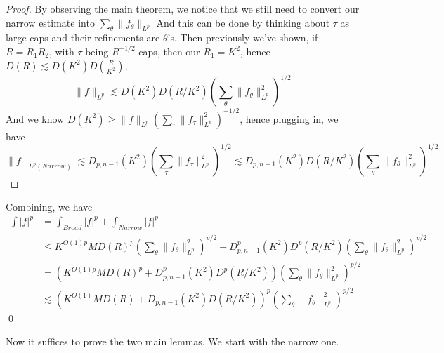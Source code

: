 \begin{proof}
    By observing the main theorem, we notice that we still need to convert our narrow estimate into $\sum_\theta\|f_\theta\|_{L^p}$
    And this can be done by thinking about $\tau$ as large caps and their refinements are $\theta$'s. Then previously we've shown, if $R=R_1R_2$, with $\tau$ being $R^{-1/2}$ caps, then our $R_1=K^2$, hence $D(R)\lesssim D(K^2)D(\frac{R}{K^2})$,
    \begin{equation*}
        \|f\|_{L^p}\lesssim D(K^2)D(R/K^2)\left(\sum_\theta\|f_\theta\|_{L^p}^2 \right)^{1/2}
    \end{equation*}
    And we know $D(K^2)\geq\|f\|_{L^p}\left(\sum_\tau\|f_\tau\|_{L^p}^2 \right)^{-1/2}$, hence plugging in, we have
    \begin{equation*}
        \|f\|_{L^p(Narrow)}\lesssim D_{p,n-1}(K^2)\left(\sum_\tau\|f_\tau\|_{L^p}^2 \right)^{1/2}\lesssim D_{p,n-1}(K^2)D(R/K^2)\left(\sum_\theta\|f_\theta\|_{L^p}^2 \right)^{1/2}
    \end{equation*}
\end{proof}
    Combining, we have
    \begin{align*}
        \int|f|^p&=\int_{Broad}|f|^p+\int_{Narrow}|f|^p\\
        &\leq K^{O(1)p}MD(R)^p\left(\sum_\theta\|f_\theta\|_{L^p}^2 \right)^{p/2}+D_{p,n-1}^p(K^2)D^p(R/K^2)\left(\sum_\theta\|f_\theta\|_{L^p}^2 \right)^{p/2}\\
        &=\left(K^{O(1)p}MD(R)^p+D_{p,n-1}^p(K^2)D^p(R/K^2)\right)\left(\sum_\theta\|f_\theta\|_{L^p}^2 \right)^{p/2}\\
        &\lesssim \left(K^{O(1)}MD(R)+D_{p,n-1}(K^2)D(R/K^2)\right)^p\left(\sum_\theta\|f_\theta\|_{L^p}^2 \right)^{p/2}
    \end{align*}
\qed

Now it suffices to prove the two main lemmas. We start with the narrow one.

